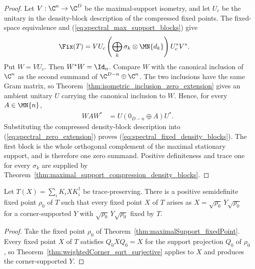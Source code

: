 \begin{proof}
    \leanok
    Let $V:\C^n\to\C^D$ be the maximal-support isometry, and let $U_c$ be
    the unitary in the density-block description of the compressed fixed
    points. The fixed-space equivalence and
    (\ref{eq:spectral_max_support_blocks}) give
    \begin{align}
        \Fix(T)
        &=VU_c\left(\bigoplus_k
          \sigma_k\otimes\MN{d_k}\right)U_c^*V^*.
        \notag
    \end{align}
    Put $W=VU_c$. Then $W^*W=\Id_n$. Compare $W$ with the canonical
    inclusion of $\C^n$ as the second summand of
    $\C^{D-n}\oplus\C^n$. The two inclusions have the same Gram matrix, so
    Theorem~\ref{thm:isometric_inclusion_zero_extension} gives an ambient
    unitary $U$ carrying the canonical inclusion to $W$. Hence, for every
    $A\in\MN{n}$,
    \begin{align}
        WAW^*
        &=U(0_{D-n}\oplus A)U^*.
        \label{eq:spectral_zero_extension}
    \end{align}
    Substituting the compressed density-block description into
    (\ref{eq:spectral_zero_extension}) proves
    (\ref{eq:spectral_fixed_density_blocks}). The first block is the whole
    orthogonal complement of the maximal stationary support, and is
    therefore one zero summand. Positive definiteness and trace one for
    every $\sigma_k$ are supplied by
    Theorem~\ref{thm:maximal_support_compression_density_blocks}.
\end{proof}

\begin{theorem}%
    \label{thm:maximalSupport_weightedCorner}
    \leanok
    Let $T(X)=\sum_iK_iXK_i^\dagger$ be trace-preserving. There is a
    positive semidefinite fixed point $\rho_0$ of $T$ such that every fixed
    point $X$ of $T$ arises as
    $X=\sqrt{\rho_0}\,Y\sqrt{\rho_0}$ for a corner-supported $Y$ with
    $\sqrt{\rho_0}\,Y\sqrt{\rho_0}$ fixed by $T$.
\end{theorem}

\begin{proof}
    \leanok
    Take the fixed point $\rho_0$ of
    Theorem~\ref{thm:maximalSupport_fixedPoint}. Every fixed point $X$ of
    $T$ satisfies $Q_0XQ_0=X$ for the support projection $Q_0$ of
    $\rho_0$, so Theorem~\ref{thm:weightedCorner_sqrt_surjective} applies
    to $X$ and produces the corner-supported $Y$.
\end{proof}

